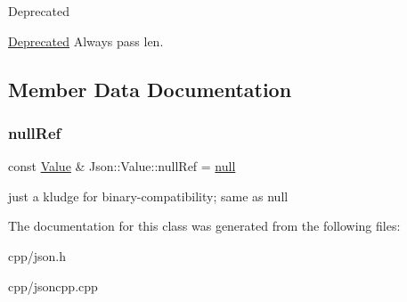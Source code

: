 \begin{DoxyRefDesc}{Deprecated}
\item[\hyperlink{deprecated__deprecated000003}{Deprecated}]Always pass len. \end{DoxyRefDesc}


\subsection{Member Data Documentation}
\mbox{\label{class_json_1_1_value_aaa4ffd4e53967170c3e8c9abf682b5cd}} 
\subsubsection{\texorpdfstring{null\+Ref}{nullRef}}
{\footnotesize\ttfamily const \hyperlink{class_json_1_1_value}{Value} \& Json\+::\+Value\+::null\+Ref = \hyperlink{class_json_1_1_value_a6d6e9ea6807e46d5b7ded66d3032f607}{null}\hspace{0.3cm}{\ttfamily [static]}}

just a kludge for binary-\/compatibility; same as null 

The documentation for this class was generated from the following files\+:\begin{DoxyCompactItemize}
\item 
cpp/json.\+h\item 
cpp/jsoncpp.\+cpp\end{DoxyCompactItemize}
